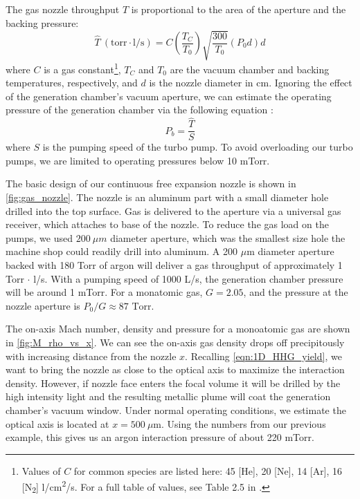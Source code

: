 The gas nozzle throughput $\hat{T}$ is proportional to the area of the aperture and the backing pressure:
\begin{equation}
\hat{T} \ (\text{torr} \cdot \text{l}/\text{s}) = C \left(\frac{T_C}{T_0} \right)\sqrt{\frac{300}{T_0}}(P_0 d) d
\label{eqn:nozzle_thruput}
\end{equation}
where $C$ is a gas constant\footnote{Values of $C$ for common species are listed here: 45 [He], 20 [Ne], 14 [Ar], 16 [N\textsubscript{2}] l/cm\textsuperscript{2}/s. For a full table of values, see Table 2.5 in \cite{millerFreeJetSources1988}.}, $T_C$ and $T_0$ are the vacuum chamber and backing temperatures, respectively, and $d$ is the nozzle diameter in cm. Ignoring the effect of the generation chamber's vacuum aperture, we can estimate the operating pressure of the generation chamber via the following equation \cite{hablanianHighvacuumTechnologyPractical1997}:
\begin{equation}
P_b = \frac{\hat{T}}{S}
\end{equation}
where $S$ is the pumping speed of the turbo pump. To avoid overloading our turbo pumps, we are  limited to operating pressures below 10 mTorr.

The basic design of our continuous free expansion nozzle is shown in \cref{fig:gas_nozzle}. The nozzle is an aluminum part with a small diameter hole drilled into the top surface. Gas is delivered to the aperture via a universal gas receiver, which attaches to base of the nozzle. To reduce the gas load on the pumps, we used $200 \ \mu m$ diameter aperture, which was the smallest size hole the machine shop could readily drill into aluminum. A 200 $\mu$m diameter aperture backed with 180 Torr of argon will deliver a gas throughput of approximately {1 Torr $\cdot$ l/s}. With a pumping speed of 1000 L/s, the generation chamber pressure will be around 1 mTorr. For a monatomic gas, $G = 2.05$, and the pressure at the nozzle aperture is $P_0/G \approx 87 \textrm{ Torr}$.

The on-axis Mach number, density and pressure for a monoatomic gas are shown in \cref{fig:M_rho_vs_x}. We can see the on-axis gas density drops off precipitously with increasing distance from the nozzle $x$. Recalling \cref{eqn:1D_HHG_yield}, we want to bring the nozzle as close to the optical axis to maximize the interaction density. However, if nozzle face enters the focal volume it will be drilled by the high intensity light and the resulting metallic plume will coat the generation chamber's vacuum window. Under normal operating conditions, we estimate the optical axis is located at $x=500 \ \mu$m. Using the numbers from our previous example, this gives us an argon interaction pressure of about 220 mTorr.

